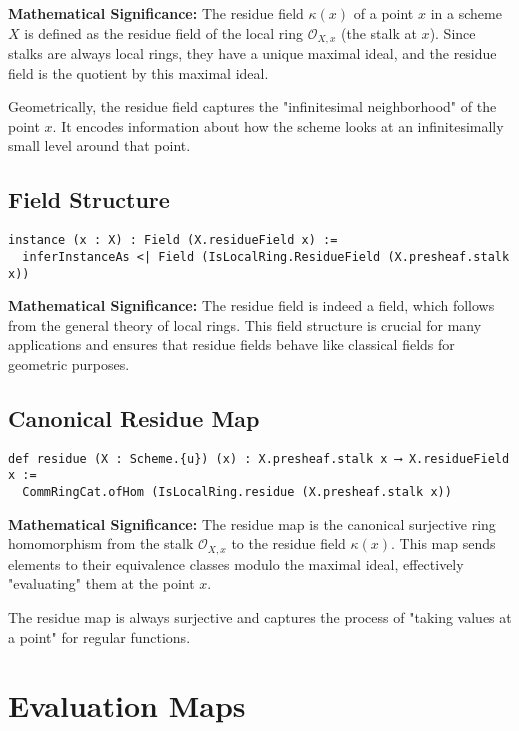 \documentclass{article}
\theoremstyle{definition}
\begin{document}
\textbf{Mathematical Significance:} The residue field $\kappa(x)$ of a point $x$ in a scheme $X$ is defined as the residue field of the local ring $\mathcal{O}_{X,x}$ (the stalk at $x$). Since stalks are always local rings, they have a unique maximal ideal, and the residue field is the quotient by this maximal ideal.

Geometrically, the residue field captures the "infinitesimal neighborhood" of the point $x$. It encodes information about how the scheme looks at an infinitesimally small level around that point.

\subsection{Field Structure}

\begin{lstlisting}
instance (x : X) : Field (X.residueField x) :=
  inferInstanceAs <| Field (IsLocalRing.ResidueField (X.presheaf.stalk x))
\end{lstlisting}

\textbf{Mathematical Significance:} The residue field is indeed a field, which follows from the general theory of local rings. This field structure is crucial for many applications and ensures that residue fields behave like classical fields for geometric purposes.

\subsection{Canonical Residue Map}

\begin{lstlisting}
def residue (X : Scheme.{u}) (x) : X.presheaf.stalk x ⟶ X.residueField x :=
  CommRingCat.ofHom (IsLocalRing.residue (X.presheaf.stalk x))
\end{lstlisting}

\textbf{Mathematical Significance:} The residue map is the canonical surjective ring homomorphism from the stalk $\mathcal{O}_{X,x}$ to the residue field $\kappa(x)$. This map sends elements to their equivalence classes modulo the maximal ideal, effectively "evaluating" them at the point $x$.

The residue map is always surjective and captures the process of "taking values at a point" for regular functions.

\section{Evaluation Maps}
\end{document}
